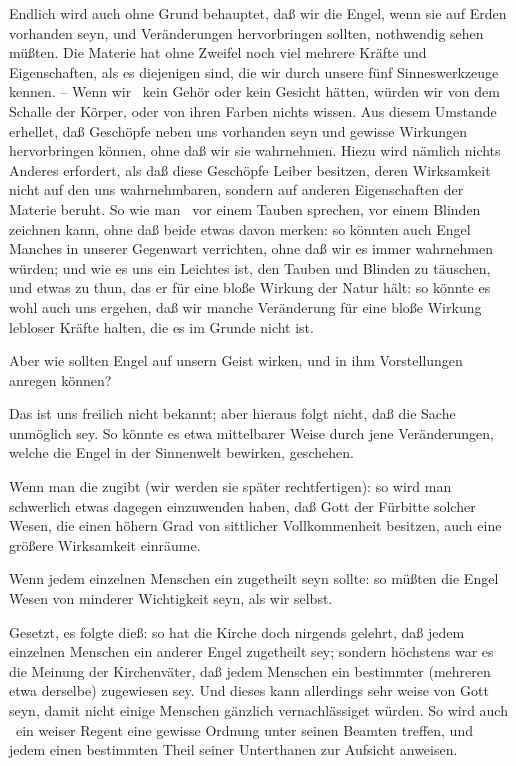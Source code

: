 \begin{aufza}
\begin{aufzb}
\begin{aufzc}
\item Endlich wird auch ohne Grund behauptet, daß wir die Engel, wenn sie auf Erden vorhanden seyn, und Veränderungen hervorbringen sollten, nothwendig sehen müßten. Die Materie hat ohne Zweifel noch viel mehrere Kräfte und Eigenschaften, als es diejenigen sind, die wir durch unsere fünf Sinneswerkzeuge kennen. -- Wenn wir \zB\ kein Gehör oder kein Gesicht hätten, würden wir von dem Schalle der Körper, oder von ihren Farben nichts wissen. Aus diesem Umstande erhellet, daß Geschöpfe neben uns vorhanden seyn und gewisse Wirkungen hervorbringen können, ohne daß wir sie wahrnehmen. Hiezu wird nämlich nichts Anderes erfordert, als daß diese Geschöpfe Leiber besitzen, deren Wirksamkeit nicht auf den uns wahrnehmbaren, sondern auf anderen Eigenschaften der Materie beruht. So wie man \zB\ vor einem Tauben sprechen, vor einem Blinden zeichnen kann, ohne daß beide etwas davon merken: so könnten auch Engel Manches in unserer Gegenwart verrichten, ohne daß wir es immer wahrnehmen würden; und wie es uns ein Leichtes ist, den Tauben und Blinden zu täuschen, und etwas zu thun, das er für eine bloße Wirkung der Natur hält: so könnte es wohl auch uns ergehen, daß wir manche Veränderung für eine bloße Wirkung lebloser Kräfte halten, die es im Grunde nicht ist.~
\end{aufzc}\par
{} Aber wie sollten Engel auf unsern Geist wirken, und in ihm Vorstellungen anregen können?\par
{} Das  ist uns freilich nicht bekannt; aber hieraus folgt nicht, daß die Sache unmöglich sey. So könnte es etwa mittelbarer Weise durch jene Veränderungen, welche die Engel in der Sinnenwelt bewirken, geschehen.
\item Wenn man die  zugibt (wir werden sie später rechtfertigen): so wird man schwerlich etwas dagegen einzuwenden haben, daß Gott der Fürbitte solcher Wesen, die einen höhern Grad von sittlicher Vollkommenheit besitzen, auch eine größere Wirksamkeit einräume.\par
\item {} Wenn jedem einzelnen Menschen ein  zugetheilt seyn sollte: so müßten die Engel Wesen von minderer Wichtigkeit seyn, als wir selbst.\par
{} Gesetzt, es folgte dieß: so hat die Kirche doch nirgends gelehrt, daß jedem einzelnen Menschen ein anderer Engel zugetheilt sey; sondern höchstens war es die Meinung der Kirchenväter, daß jedem Menschen ein bestimmter (mehreren etwa derselbe) zugewiesen sey. Und dieses kann allerdings sehr weise von Gott seyn, damit nicht einige Menschen gänzlich vernachlässiget würden. So wird auch \zB\ ein weiser Regent eine gewisse Ordnung unter seinen Beamten treffen, und jedem einen bestimmten Theil seiner Unterthanen zur Aufsicht anweisen.

\end{aufzb}
\end{aufza}
